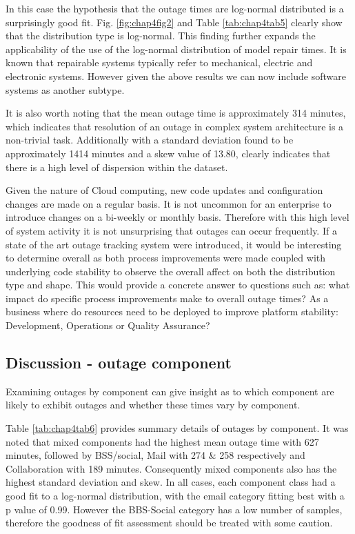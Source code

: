 In this case the hypothesis that the outage times are log-normal distributed is a surprisingly good fit. Fig. \ref{fig:chap4fig2} and Table \ref{tab:chap4tab5} clearly show that the distribution type is log-normal. This finding further expands the applicability of the use of the log-normal distribution of model repair times. It is known that repairable systems typically refer to mechanical, electric and electronic systems. However given the above results we can now include software systems as another subtype.\par

It is also worth noting that the mean outage time is approximately 314 minutes, which indicates that resolution of an outage in complex system architecture is a non-trivial task. Additionally with a standard deviation found to be approximately 1414 minutes and a skew value of 13.80, clearly indicates that there is a high level of dispersion within the dataset. \par

Given the nature of Cloud computing, new code updates and configuration changes are made on a regular basis. It is not uncommon for an enterprise to introduce changes on a bi-weekly or monthly basis. Therefore with this high level of system activity it is not unsurprising that outages can occur frequently. If a state of the art outage tracking system were introduced, it would be interesting to determine overall as both process improvements were made coupled with underlying code stability to observe the overall affect on both the distribution type and shape. This would provide a concrete answer to questions such as: what impact do specific process improvements make to overall outage times? As a business where do resources need to be deployed to improve platform stability: Development, Operations or Quality Assurance? \par

\subsection{Discussion - outage component}

Examining outages by component can give insight as to which component are likely to exhibit outages and whether these times vary by component. \par

Table \ref{tab:chap4tab6} provides summary details of outages by component. It was noted that mixed components had the highest mean outage time with 627 minutes, followed by BSS/social, Mail with 274 \& 258 respectively and Collaboration with 189 minutes. Consequently mixed components also has the highest standard deviation and skew. In all cases, each component class had a good fit to a log-normal distribution, with the email category fitting best with a p value of 0.99. However the BBS-Social category has a low number of samples, therefore the goodness of fit assessment should be treated with some caution. \par

